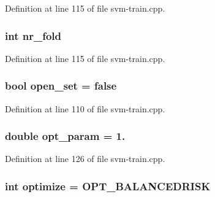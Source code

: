 Definition at line 115 of file svm-\/train.\-cpp.

\hypertarget{_2svm-train_8cpp_a8e8ea59d1060e411ced9b25867c66651}{
\subsubsection[{nr\-\_\-fold}]{\setlength{\rightskip}{0pt plus 5cm}int nr\-\_\-fold}}\label{_2svm-train_8cpp_a8e8ea59d1060e411ced9b25867c66651}


Definition at line 115 of file svm-\/train.\-cpp.

\hypertarget{_2svm-train_8cpp_a17843ee1d8102ef588a3f997e827bc70}{
\subsubsection[{open\-\_\-set}]{\setlength{\rightskip}{0pt plus 5cm}bool open\-\_\-set = false}}\label{_2svm-train_8cpp_a17843ee1d8102ef588a3f997e827bc70}


Definition at line 110 of file svm-\/train.\-cpp.

\hypertarget{_2svm-train_8cpp_aea4397c2cc729e6e21e3eab9b9a2351e}{
\subsubsection[{opt\-\_\-param}]{\setlength{\rightskip}{0pt plus 5cm}double opt\-\_\-param = 1.}}\label{_2svm-train_8cpp_aea4397c2cc729e6e21e3eab9b9a2351e}


Definition at line 126 of file svm-\/train.\-cpp.

\hypertarget{_2svm-train_8cpp_aa33cf9fcdc419d39c5d05fa458bf089a}{
\subsubsection[{optimize}]{\setlength{\rightskip}{0pt plus 5cm}int optimize = {\bf O\-P\-T\-\_\-\-B\-A\-L\-A\-N\-C\-E\-D\-R\-I\-S\-K}}}\label{_2svm-train_8cpp_aa33cf9fcdc419d39c5d05fa458bf089a}


